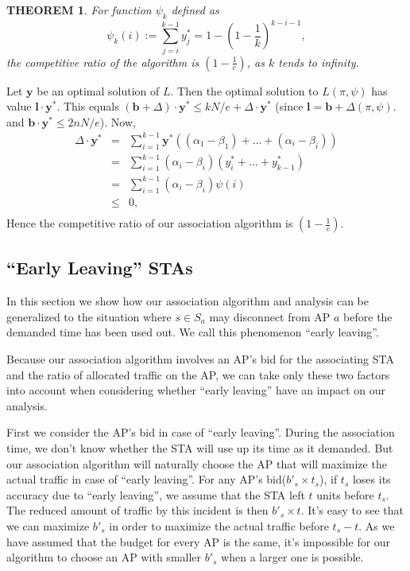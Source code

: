\documentclass[conference]{IEEEtran}
\newtheorem{theorem}{THEOREM}
\begin{document}
  \begin{theorem}
    For function $\psi_k$ defined as
    \begin{equation*}
      \psi_k(i):=\sum_{j=i}^{k-1}y_{j}^{*}=1-(1-\frac{1}{k})^{k-i-1},
    \end{equation*}
    the competitive ratio of the algorithm is $(1-\frac{1}{e})$, as $k$ tends to infinity.
  \end{theorem}
  \begin{IEEEproof}
    Let $\bm{y}$ be an optimal solution of $L$. Then the optimal solution to $L(\pi,\psi)$ has value $\bm{l}\cdot\bm{y}^*$.  This equals $(\bm{b}+\Delta)\cdot \bm{y}^*\leq kN/e+\Delta\cdot \bm{y}^*$ (since $ \bm{l}=\bm{b}+\Delta(\pi,\psi).$ and $\bm{b}\cdot \bm{y}^*\leq 2nN/e$).  Now,
    \begin{eqnarray*}
      \Delta\cdot \bm{y}^{*}&=&\sum_{i=1}^{k-1}\bm{y}^{*}((\alpha_1-\beta_1)+\ldots+(\alpha_i-\beta_i))\\
      &=&\sum_{i=1}^{k-1}(\alpha_i-\beta_i)(y_i^{*}+\ldots+y_{k-1}^{*})\\
      &=&\sum_{i=1}^{k-1}(\alpha_i-\beta_i)\psi(i)\\
      &\leq& 0,\\
    \end{eqnarray*}
     Hence the competitive ratio of our association algorithm is $(1-\frac{1}{e})$.
  \end{IEEEproof}

  \subsection{``Early Leaving'' STAs}

  In this section we show how our association algorithm and analysis can be generalized to the situation where $s\in S_a$ may disconnect from AP $a$ before the demanded time has been used out. We call this phenomenon ``early leaving''.

  Because our association algorithm involves an AP's bid for the associating STA and the ratio of allocated traffic on the AP, we can take only these two factors into account when considering whether ``early leaving'' have an impact on our analysis.

  First we consider the AP's bid in case of ``early leaving''. During the association time, we don't know whether the STA will use up its time as it demanded. But our association algorithm will naturally choose the AP that will maximize the actual traffic in case of ``early leaving''. For any AP's bid($b'_s \times t_s$), if  $t_s$ loses its accuracy due to ``early leaving'', we assume that the STA left $t$ units before $t_s$. The reduced amount of traffic by this incident is then $b'_s \times t$. It's easy to see that we can maximize $b'_s$ in order to maximize the actual traffic before $t_s-t$. As we have assumed that the budget for every AP is the same, it's impossible for our algorithm to choose an AP with smaller $b'_s$ when a larger one is possible.
\end{document}
